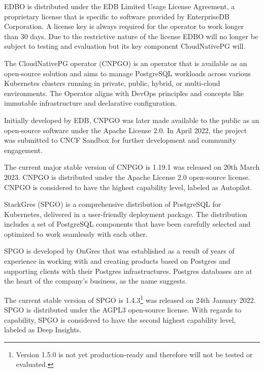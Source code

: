 EDBO is distributed under the EDB Limited Usage License Agreement, a proprietary license that is specific to software provided by EnterpriseDB Corporation. A license key is always required for the operator to work longer than 30 days. \cite{EDBdocuLicence} Due to the restrictive nature of the license EDBO will no longer be subject to testing and evaluation but its key component CloudNativePG will.

The CloudNativePG operator (CNPGO) is an operator that is available as an open-source solution and aims to manage PostgreSQL workloads across various Kubernetes clusters running in private, public, hybrid, or multi-cloud environments. The Operator aligns with DevOps principles and concepts like immutable infrastructure and declarative configuration. \cite{CNPGdocu}

Initially developed by EDB, CNPGO was later made available to the public as an open-source software under the Apache License 2.0. In April 2022, the project was submitted to CNCF Sandbox for further development and community engagement. \cite{CNPGdocu}

The current major stable version of CNPGO is 1.19.1 was released on 20th March 2023. \cite{CNPGreleases} CNPGO is distributed under the Apache License 2.0 open-source license. CNPGO is considered to have the highest capability level, labeled as Autopilot. \cite{CNPGdocu}

StackGres (SPGO) is a comprehensive distribution of PostgreSQL for Kubernetes, delivered in a user-friendly deployment package. The distribution includes a set of PostgreSQL components that have been carefully selected and optimized to work seamlessly with each other. \cite{SPGOgitlab}

SPGO is developed by OnGres that was established as a result of years of experience in working with and creating products based on Postgres and supporting clients with their Postgres infrastructures. Postgres databases are at the heart of the company's business, as the name suggests. \cite{OnGres}


The current stable version of SPGO is 1.4.3\footnote{Version 1.5.0 is not yet production-ready and therefore will not be tested or evaluated.} was released on 24th January 2022. \cite{SPGOgitlabChangelog} SPGO is distributed under the AGPL3 open-source license. \cite{SPGODocuLicence}
With regards to capability, SPGO is considered to have the second highest capability level, labeled as Deep Insights. \cite{OperatorHubStackgres}

